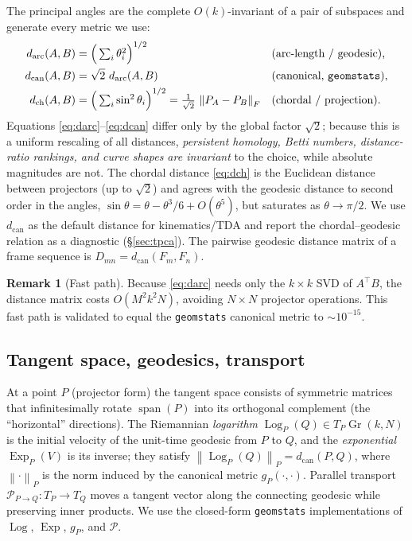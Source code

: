 \documentclass[11pt]{article}
\newcommand{\Gr}{\operatorname{Gr}}
\newcommand{\Log}{\operatorname{Log}}
\newcommand{\Exp}{\operatorname{Exp}}
\newcommand{\PT}{\mathcal{P}}
\newcommand{\norm}[1]{\left\lVert #1 \right\rVert}
\newcommand{\Span}{\operatorname{span}}
\theoremstyle{definition}
\newtheorem{remark}{Remark}
\begin{document}
The principal angles are the complete $O(k)$-invariant of a pair of subspaces and
generate every metric we use:
\begin{align}
d_{\mathrm{arc}}(A,B) &= \Big(\textstyle\sum_{i} \theta_i^2\Big)^{1/2}
&&\text{(arc-length / geodesic),}\label{eq:darc}\\
d_{\mathrm{can}}(A,B) &= \sqrt{2}\,\, d_{\mathrm{arc}}(A,B)
&&\text{(canonical, \texttt{geomstats}),}\label{eq:dcan}\\
d_{\mathrm{ch}}(A,B) &= \Big(\textstyle\sum_i \sin^2\theta_i\Big)^{1/2}
= \tfrac{1}{\sqrt 2}\,\norm{P_A - P_B}_F
&&\text{(chordal / projection).}\label{eq:dch}
\end{align}
Equations \eqref{eq:darc}--\eqref{eq:dcan} differ only by the global factor
$\sqrt 2$; because this is a uniform rescaling of all distances, \emph{persistent
homology, Betti numbers, distance-ratio rankings, and curve \emph{shapes} are
invariant} to the choice, while absolute magnitudes are not. The chordal distance
\eqref{eq:dch} is the Euclidean distance between projectors (up to $\sqrt2$) and
agrees with the geodesic distance to second order in the angles,
$\sin\theta = \theta - \theta^3/6 + O(\theta^5)$, but saturates as
$\theta\to\pi/2$. We use $d_{\mathrm{can}}$ as the default distance for
kinematics/TDA and report the chordal--geodesic relation as a diagnostic
(\S\ref{sec:tpca}). The pairwise geodesic distance matrix of a frame sequence is
$D_{mn} = d_{\mathrm{can}}(F_m,F_n)$.

\begin{remark}[Fast path]
Because \eqref{eq:darc} needs only the $k\times k$ SVD of $A^\top B$, the distance
matrix costs $O(M^2 k^2 N)$, avoiding $N\times N$ projector operations. This fast
path is validated to equal the \texttt{geomstats} canonical metric to $\sim10^{-15}$.
\end{remark}

\subsection{Tangent space, geodesics, transport}
At a point $P$ (projector form) the tangent space consists of symmetric matrices
that infinitesimally rotate $\Span(P)$ into its orthogonal complement (the
``horizontal'' directions). The Riemannian \emph{logarithm}
$\Log_P(Q)\in T_P\Gr(k,N)$ is the initial velocity of the unit-time geodesic from $P$
to $Q$, and the \emph{exponential} $\Exp_P(V)$ is its inverse; they satisfy
$\norm{\Log_P(Q)}_P = d_{\mathrm{can}}(P,Q)$, where $\norm{\cdot}_P$ is the norm
induced by the canonical metric $g_P(\cdot,\cdot)$. Parallel transport
$\PT_{P\to Q}:T_P\to T_Q$ moves a tangent vector along the connecting geodesic while
preserving inner products. We use the closed-form \texttt{geomstats} implementations
of $\Log$, $\Exp$, $g_P$, and $\PT$.
\end{document}
